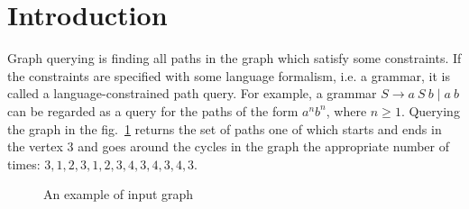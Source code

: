 \section{Introduction}

Graph querying is finding all paths in the graph which satisfy some constraints. 
If the constraints are specified with some language formalism, i.e. a grammar, it is called a language-constrained path query. 
For example, a grammar $S \rightarrow a \ S \ b \mid a \ b$ can be regarded as a query for the paths of the form $a^n b^n$, where $n \geq 1$.
Querying the graph in the fig.~\ref{fig:exmplInputGraph} returns the set of paths one of which starts and ends in the vertex $3$ and goes around the cycles in the graph the appropriate number of times: $3,1,2,3,1,2,3,4,3,4,3,4,3$. 




\begin{figure}[h]
\caption{An example of input graph}
\label{fig:exmplInputGraph}
\end{figure}

